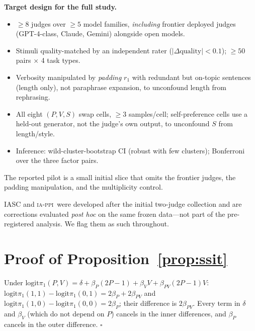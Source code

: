 \documentclass{article}
\newcommand{\logit}{\mathrm{logit}}
\newcommand{\IAPPI}{\textsc{ia-ppi}}
\begin{document}
\noindent\textbf{Target design for the full study.}
\begin{itemize}\itemsep1pt
\item $\geq 8$ judges over $\geq 5$ model families, \emph{including}
  frontier deployed judges (GPT-4-class, Claude, Gemini) alongside
  open models.
\item Stimuli quality-matched by an independent rater
  ($|\Delta\text{quality}|<0.1$); $\geq 50$ pairs $\times$ 4 task
  types.
\item Verbosity manipulated by \emph{padding} $r_1$ with redundant
  but on-topic sentences (length only), not paraphrase expansion,
  to unconfound length from rephrasing.
\item All eight $(P,V,S)$ swap cells, $\geq 3$ samples/cell;
  self-preference cells use a held-out generator, not the judge's
  own output, to unconfound $S$ from length/style.
\item Inference: wild-cluster-bootstrap CI (robust with few
  clusters); Bonferroni over the three factor pairs.
\end{itemize}
The reported pilot is a small initial slice that omits the frontier
judges, the padding manipulation, and the multiplicity control.

IASC and \IAPPI\ were developed after the initial two-judge
collection and are corrections evaluated \emph{post hoc} on the same
frozen data---not part of the pre-registered analysis. We flag them
as such throughout.

\section{Proof of Proposition~\ref{prop:ssit}}
\label{app:ssit}
Under $\logit\pi_1(P,V)=\delta+\beta_P(2P{-}1)+\beta_V V
+\beta_{PV}(2P{-}1)V$:
$\logit\pi_1(1,1)-\logit\pi_1(0,1)=2\beta_P+2\beta_{PV}$ and
$\logit\pi_1(1,0)-\logit\pi_1(0,0)=2\beta_P$; their difference is
$2\beta_{PV}$. Every term in $\delta$ and $\beta_V$ (which do not
depend on $P$) cancels in the inner differences, and $\beta_P$
cancels in the outer difference. \hfill$\square$
\end{document}
